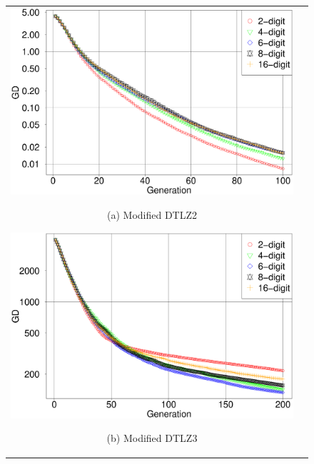 \documentclass[../main/main]{subfiles}
\begin{document}
\begin{figure}[htbp]
\begin{tabular}{cc}
\begin{minipage}{0.32\hsize}
\includegraphics[width=1\linewidth]{../figures/MOEAD/DTLZ2_another_GD.eps}
\begin{center}
{\footnotesize (a) Modified DTLZ2}
\end{center}
\end{minipage}
\begin{minipage}{0.32\hsize}
\includegraphics[width=1\linewidth]{../figures/MOEAD/DTLZ3_another_GD.eps}
\begin{center}
{\footnotesize (b) Modified DTLZ3}
\end{center}
\end{minipage}
\begin{minipage}{0.32\hsize}

\end{minipage}
\end{tabular}
\end{figure}
\end{document}
